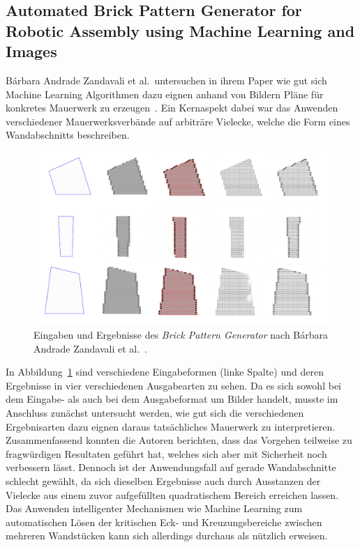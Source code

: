 \subsection{Automated Brick Pattern Generator for Robotic Assembly using Machine Learning and Images}
Bárbara Andrade Zandavali et al.\ untersuchen in ihrem Paper wie gut sich Machine Learning Algorithmen dazu eignen anhand von Bildern Pläne für konkretes Mauerwerk zu erzeugen~\cite{Zandavali2019}.
Ein Kernaspekt dabei war das Anwenden verschiedener Mauerwerksverbände auf arbiträre Vielecke, welche die Form eines Wandabschnitts beschreiben.
\begin{figure}[ht!]
    \centering
    \includegraphics[width=0.8\columnwidth]{fig/ecaadesigradi2019_605.png}
    \caption{Eingaben und Ergebnisse des \textit{Brick Pattern Generator} nach Bárbara Andrade Zandavali et al.~\cite{Zandavali2019}.}\label{fig:related:Zandavali2019}
\end{figure}
In Abbildung~\ref{fig:related:Zandavali2019} sind verschiedene Eingabeformen (linke Spalte) und deren Ergebnisse in vier verschiedenen Ausgabearten zu sehen.
Da es sich sowohl bei dem Eingabe- als auch bei dem Ausgabeformat um Bilder handelt, musste im Anschluss zunächst untersucht werden, wie gut sich die verschiedenen Ergebnisarten dazu eignen daraus tatsächliches Mauerwerk zu interpretieren.
Zusammenfassend konnten die Autoren berichten, dass das Vorgehen teilweise zu fragwürdigen Resultaten geführt hat, welches sich aber mit Sicherheit noch verbessern lässt.
Dennoch ist der Anwendungsfall auf gerade Wandabschnitte schlecht gewählt, da sich dieselben Ergebnisse auch durch \glqq{}Ausstanzen\grqq{} der Vielecke aus einem zuvor aufgefüllten quadratischem Bereich erreichen lassen.
Das Anwenden intelligenter Mechanismen wie Machine Learning zum automatischen Lösen der kritischen Eck- und Kreuzungsbereiche zwischen mehreren Wandstücken kann sich allerdings durchaus als nützlich erweisen.

